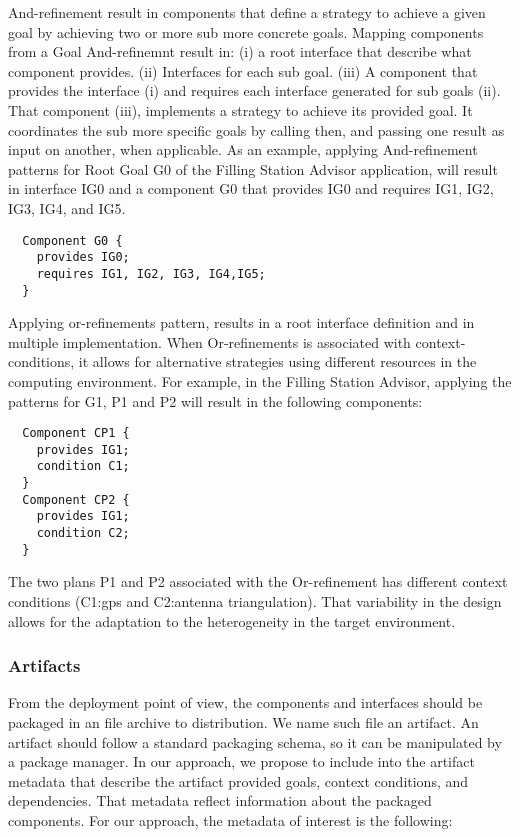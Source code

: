 And-refinement result in components that define a strategy to achieve a given goal by achieving two or more sub more concrete goals.
Mapping components from a Goal And-refinemnt result in: (i) a root interface that describe what component provides. (ii) Interfaces for each sub goal. (iii) A component that provides the interface (i) and requires each interface generated for sub goals (ii). That component (iii), implements a strategy to achieve its provided goal. It coordinates the sub more specific goals by calling then, and passing one result as input on another, when applicable.
As an example, applying And-refinement patterns for Root Goal G0 of the Filling Station Advisor application, will result in interface IG0 and a component G0 that provides IG0 and requires IG1, IG2, IG3, IG4, and IG5.
\begin{lstlisting}
  Component G0 {
    provides IG0;
    requires IG1, IG2, IG3, IG4,IG5;
  }
\end{lstlisting}

Applying or-refinements pattern, results in a root interface definition and in multiple implementation. When Or-refinements is associated with context-conditions, it allows for alternative strategies using different resources in the computing environment. For example, in the Filling Station Advisor, applying the patterns for G1, P1 and P2 will result in the following components:

\begin{lstlisting}
  Component CP1 {
    provides IG1;
    condition C1;
  }
  Component CP2 {
    provides IG1;
    condition C2;
  }
\end{lstlisting}

The two plans P1 and P2 associated with the Or-refinement has different context conditions (C1:gps and C2:antenna triangulation).
That variability in the design allows for the adaptation to the heterogeneity in the target environment.

\subsubsection{Artifacts}
\label{sec_artifacts}

From the deployment point of view, the components and interfaces should be packaged in an file archive to distribution. We name such file an artifact.
An artifact should follow a standard packaging schema, so it can be manipulated by a package manager.
In our approach, we propose to include into the artifact metadata that describe the artifact provided goals, context conditions, and dependencies. That metadata reflect information about the packaged components. For our approach, the metadata of interest is the following:

